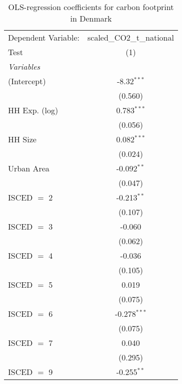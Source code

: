 
\begin{table}[htbp!]
   \centering
   \small
   \begin{adjustbox}{width = 1\textwidth, max height = 0.95\textheight, center}
      \begin{threeparttable}[b]
         \caption{\label{tab:OLS_2_DNK} OLS-regression coefficients for carbon footprint in Denmark}
         \begin{tabular}{lc}
            \tabularnewline \midrule \midrule
            Dependent Variable: & scaled\_CO2\_t\_national\\     
            Test                & (1)\\  
            \midrule
            \emph{Variables}\\
            (Intercept)         & -8.32$^{***}$\\   
                                & (0.560)\\   
            HH Exp. (log)       & 0.783$^{***}$\\   
                                & (0.056)\\   
            HH Size             & 0.082$^{***}$\\   
                                & (0.024)\\   
            Urban Area          & -0.092$^{**}$\\   
                                & (0.047)\\   
            ISCED $=$ 2         & -0.213$^{**}$\\   
                                & (0.107)\\   
            ISCED $=$ 3         & -0.060\\   
                                & (0.062)\\   
            ISCED $=$ 4         & -0.036\\   
                                & (0.105)\\   
            ISCED $=$ 5         & 0.019\\   
                                & (0.075)\\   
            ISCED $=$ 6         & -0.278$^{***}$\\   
                                & (0.075)\\   
            ISCED $=$ 7         & 0.040\\   
                                & (0.295)\\   
            ISCED $=$ 9         & -0.255$^{**}$\\   

\end{tabular}
\end{threeparttable}
\end{adjustbox}
\end{table}
